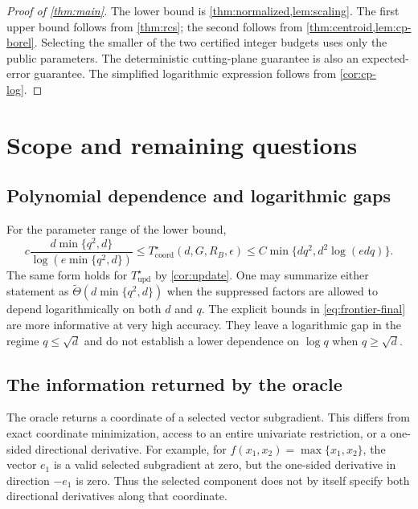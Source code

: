 \documentclass[11pt]{article}
\numberwithin{equation}{section}
\theoremstyle{definition}
\theoremstyle{remark}
\newcommand{\Tcoord}{T_{\mathrm{coord}}^\star}
\newcommand{\Tupd}{T_{\mathrm{upd}}^\star}
\newcommand{\eps}{\epsilon}
\begin{document}
\begin{proof}[Proof of \cref{thm:main}]
The lower bound is \cref{thm:normalized,lem:scaling}. The first upper bound follows from \cref{thm:rcs}; the second follows from \cref{thm:centroid,lem:cp-borel}. Selecting the smaller of the two certified integer budgets uses only the public parameters. The deterministic cutting-plane guarantee is also an expected-error guarantee. The simplified logarithmic expression follows from \cref{cor:cp-log}.
\end{proof}

\section{Scope and remaining questions}\label{sec:scope}

\subsection{Polynomial dependence and logarithmic gaps}

For the parameter range of the lower bound,
\begin{equation}\label{eq:frontier-final}
c\frac{d\min\{q^2,d\}}{\log(e\min\{q^2,d\})}
\le\Tcoord(d,G,R_B,\eps)
\le C\min\{dq^2,d^2\log(edq)\}.
\end{equation}
The same form holds for $\Tupd$ by \cref{cor:update}. One may summarize either statement as $\widetilde\Theta(d\min\{q^2,d\})$ when the suppressed factors are allowed to depend logarithmically on both $d$ and $q$. The explicit bounds in \eqref{eq:frontier-final} are more informative at very high accuracy. They leave a logarithmic gap in the regime $q\le\sqrt d$ and do not establish a lower dependence on $\log q$ when $q\ge\sqrt d$.

\subsection{The information returned by the oracle}

The oracle returns a coordinate of a selected vector subgradient. This differs from exact coordinate minimization, access to an entire univariate restriction, or a one-sided directional derivative. For example, for $f(x_1,x_2)=\max\{x_1,x_2\}$, the vector $e_1$ is a valid selected subgradient at zero, but the one-sided derivative in direction $-e_1$ is zero. Thus the selected component does not by itself specify both directional derivatives along that coordinate.
\end{document}
